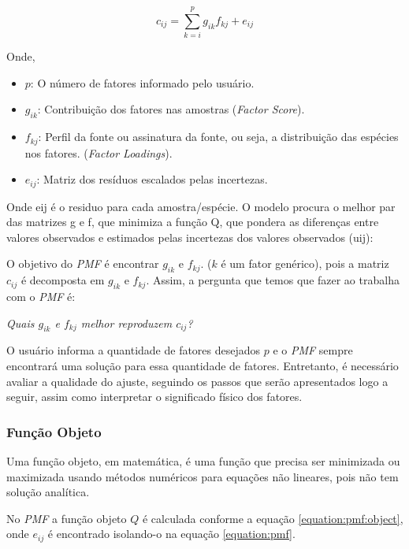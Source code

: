 \begin{equation}
  c_{ij} = \sum_{k=i}^p g_{ik}f_{kj} + e_{ij}
  \label{equation:pmf}
\end{equation}

Onde,
\begin{itemize}
  \item $p$: O número de fatores informado pelo usuário.
  \item $g_{ik}$: Contribuição dos fatores nas amostras (\textit{Factor Score}).
  \item $f_{kj}$: Perfil da fonte ou assinatura da fonte, ou seja, 
        a distribuição das espécies nos fatores. (\textit{Factor Loadings}).
  \item $e_{ij}$: Matriz dos resíduos escalados pelas incertezas.
\end{itemize}

Onde eij é o residuo para cada amostra/espécie.
O modelo procura o melhor par das matrizes g e f, que minimiza a função Q, que pondera as diferenças entre valores observados e estimados pelas incertezas dos valores observados (uij):

O objetivo do \textit{PMF} é encontrar $g_{ik}$ e $f_{kj}$. 
($k$ é um fator genérico), pois a matriz $c_{ij}$ é decomposta em 
$g_{ik}$ e $f_{kj}$. Assim, a pergunta que temos que fazer ao trabalha com 
o \textit{PMF} é: 

\textit{Quais $g_{ik}$ e $f_{kj}$ melhor reproduzem $c_{ij}$?}

O usuário informa a quantidade de fatores desejados $p$ e o \textit{PMF} 
sempre encontrará uma solução para essa quantidade de fatores. 
Entretanto, é necessário avaliar a qualidade do ajuste, seguindo os passos 
que serão apresentados logo a seguir, assim como interpretar o significado 
físico dos fatores. 

\subsubsection{Função Objeto}

Uma função objeto, em matemática, é uma função que precisa ser minimizada 
ou maximizada usando métodos numéricos para equações não lineares, pois não 
tem solução analítica. 

No \textit{PMF} a função objeto $Q$ é calculada conforme a equação 
\ref{equation:pmf:object}, onde ${e_{ij}}$ é encontrado isolando-o na 
equação \ref{equation:pmf}.


